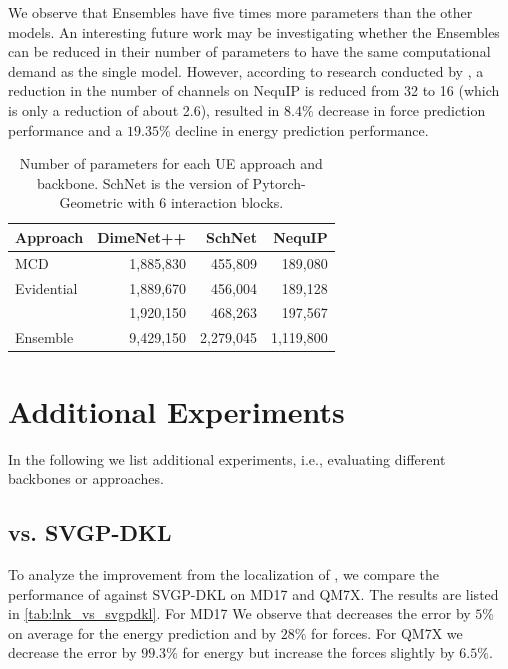 We observe that Ensembles have five times more parameters than the other models. An interesting future work may be investigating whether the Ensembles can be reduced in their number of parameters to have the same computational demand as the single model. However, according to research conducted by \citet{batatia2022design}, a reduction in the number of channels on NequIP is reduced from 32 to 16 (which is only a reduction of about 2.6), resulted in $8.4\%$ decrease in force prediction performance and a $19.35\%$ decline in energy prediction performance. 

\begin{table}[h!]
    \centering
    \begin{tabular}{l|rrr}
\toprule
Approach & DimeNet++ & SchNet & NequIP\\
\midrule
MCD & 1,885,830 & 455,809 & 189,080\\
Evidential & 1,889,670 & 456,004 & 189,128\\
\oursacro{} & 1,920,150 & 468,263 & 197,567\\
Ensemble & 9,429,150 & 2,279,045 & 1,119,800\\
\bottomrule
    \end{tabular}
    \caption{Number of parameters for each UE approach and backbone. SchNet is the version of Pytorch-Geometric with 6 interaction blocks.}
    \label{tab:num_parameters}
\end{table}



\section{Additional Experiments} \label{app:additional_experiments}
In the following we list additional experiments, i.e., evaluating different backbones or approaches.

\subsection{\oursacro{} vs. SVGP-DKL}\label{app:svgp_vs_lnk}
To analyze the improvement from the localization of \oursacro{}, we compare the performance of \oursacro{} against SVGP-DKL on MD17 and QM7X. The results are listed in \cref{tab:lnk_vs_svgpdkl}. For MD17 We observe that \oursacro{} decreases the error by $5\%$ on average for the energy prediction and by $28\%$ for forces. For QM7X we decrease the error by $99.3\%$ for energy but increase the forces slightly by $6.5\%$.
\begin{table}[h!]
    \centering
    
\caption{Comparison of LNK vs SVGP-DKL with DimeNet++ as backbone.}
\label{tab:lnk_vs_svgpdkl}
\end{table}

